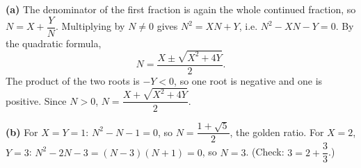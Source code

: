 \textbf{(a)} The denominator of the first fraction is again the whole continued fraction, so $N=X+\dfrac {Y}{N}$. Multiplying by $N\ne0$ gives $N^2=XN+Y$, i.e. $N^2-XN-Y=0$. By the quadratic formula,
\[N=\dfrac{X\pm\sqrt{X^2+4Y}}{2}.\]
The product of the two roots is $-Y<0$, so one root is negative and one is positive. Since $N>0$, $N=\dfrac{X+\sqrt{X^2+4Y}}{2}$.

\textbf{(b)} For $X=Y=1$: $N^2-N-1=0$, so $N=\boxed{\dfrac{1+\sqrt5}{2}}$, the golden ratio. For $X=2$, $Y=3$: $N^2-2N-3=(N-3)(N+1)=0$, so $N=\boxed{3}$. (Check: $3=2+\dfrac{3}{3}$.)
